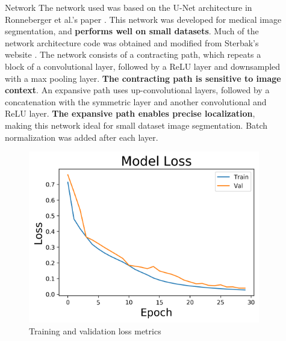\documentclass[final]{beamer}
\newlength{\sepwid}
\newlength{\onecolwid}
\begin{document}
\begin{frame}[t]
\begin{columns}[t]
\begin{column}{\onecolwid}
\begin{block}{Network}
The network used was based on the U-Net architecture in Ronneberger et al.'s paper \cite{DBLP:journals/corr/RonnebergerFB15}. This network was developed for medical image segmentation, and \textbf{performs well on small datasets}. Much of the network architecture code was obtained and modified from Sterbak's website \cite{manual}. The network consists of a contracting path, which repeats a block of a convolutional layer, followed by a ReLU layer and downsampled with a max pooling layer. \textbf{The contracting path is sensitive to image context}. An expansive path uses up-convolutional layers, followed by a concatenation with the symmetric layer and another convolutional and ReLU layer. \textbf{The expansive path enables precise localization}, making this network ideal for small dataset image segmentation. Batch normalization was added after each layer.
\end{block}





\begin{figure}
    \centering
    \includegraphics[width=\textwidth]{pictures/loss.png}
    \caption{Training and validation loss metrics}
    \label{fig:loss}
\end{figure}



\end{column}


\begin{column}{\sepwid}\end{column} %

\begin{column}{\onecolwid}


\end{column}
\end{columns}
\end{frame}
\end{document}

